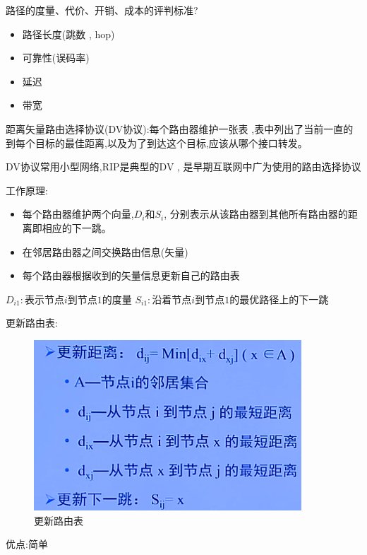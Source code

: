 \documentclass[UTF8,a4paper]{ctexart}
\begin{document}
路径的度量、代价、开销、成本的评判标准?
\begin{itemize}
  \item 路径长度(跳数 , hop)
  \item 可靠性(误码率)
  \item 延迟
  \item 带宽
\end{itemize}

距离矢量路由选择协议(DV协议):每个路由器维护一张表 ,表中列出了当前一直的到每个目标的最佳距离,以及为了到达这个目标,应该从哪个接口转发。

DV协议常用小型网络,RIP是典型的DV , 是早期互联网中广为使用的路由选择协议

工作原理:
\begin{itemize}
  \item 每个路由器维护两个向量,$D_i$和$S_i$, 分别表示从该路由器到其他所有路由器的距离即相应的下一跳。
  \item 在邻居路由器之间交换路由信息(矢量)
  \item 每个路由器根据收到的矢量信息更新自己的路由表
\end{itemize}

$D_{i1}:表示节点i到节点1的度量$
$S_{i1}:沿着节点i到节点1的最优路径上的下一跳$

更新路由表:
\begin{figure}[H]
  \centering
  \includegraphics[scale = 0.3]{assets/jisuanjiwangluo_9d1fe.png}
  \caption{更新路由表}
\end{figure}

优点:简单
\end{document}
